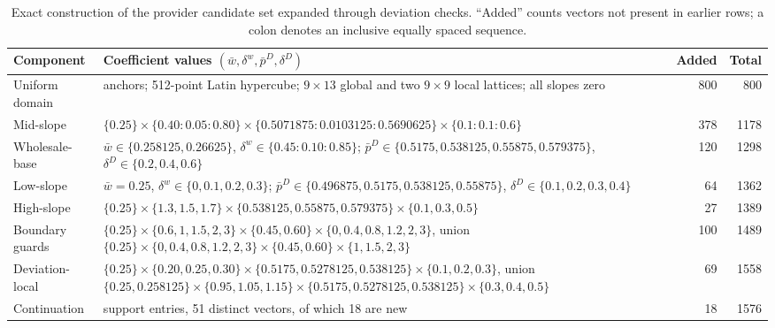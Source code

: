 \documentclass[11pt,a4paper]{article}
\begin{document}
\begin{table}[H]
\centering
\caption{Exact construction of the provider candidate set expanded through deviation checks. ``Added'' counts vectors not present in earlier rows; a colon denotes an inclusive equally spaced sequence.}
\label{tab:candidate_design}
\scriptsize
\begin{tabular}{@{}p{}>{\raggedright\arraybackslash}p{}rr@{}}
\toprule
Component & Coefficient values $(\bar w,\delta^w,\bar p^D,\delta^D)$ & Added & Total \\
\midrule
Uniform domain & 12 anchors; 512-point Latin hypercube; $9\times13$ global and two $9\times9$ local lattices; all slopes zero & 800 & 800 \\
Mid-slope & $\{0.25\}\times\{0.40{:}0.05{:}0.80\}\times\{0.5071875{:}0.0103125{:}0.5690625\}\times\{0.1{:}0.1{:}0.6\}$ & 378 & 1178 \\
Wholesale-base & $\bar w\in\{0.258125,0.26625\}$, $\delta^w\in\{0.45{:}0.10{:}0.85\}$; $\bar p^D\in\{0.5175,0.538125,0.55875,0.579375\}$, $\delta^D\in\{0.2,0.4,0.6\}$ & 120 & 1298 \\
Low-slope & $\bar w=0.25$, $\delta^w\in\{0,0.1,0.2,0.3\}$; $\bar p^D\in\{0.496875,0.5175,0.538125,0.55875\}$, $\delta^D\in\{0.1,0.2,0.3,0.4\}$ & 64 & 1362 \\
High-slope & $\{0.25\}\times\{1.3,1.5,1.7\}\times\{0.538125,0.55875,0.579375\}\times\{0.1,0.3,0.5\}$ & 27 & 1389 \\
Boundary guards & $\{0.25\}\times\{0.6,1,1.5,2,3\}\times\{0.45,0.60\}\times\{0,0.4,0.8,1.2,2,3\}$, union $\{0.25\}\times\{0,0.4,0.8,1.2,2,3\}\times\{0.45,0.60\}\times\{1,1.5,2,3\}$ & 100 & 1489 \\
Deviation-local & $\{0.25\}\times\{0.20,0.25,0.30\}\times\{0.5175,0.5278125,0.538125\}\times\{0.1,0.2,0.3\}$, union $\{0.25,0.258125\}\times\{0.95,1.05,1.15\}\times\{0.5175,0.5278125,0.538125\}\times\{0.3,0.4,0.5\}$ & 69 & 1558 \\
Continuation & 52 support entries, 51 distinct vectors, of which 18 are new & 18 & 1576 \\
\bottomrule
\end{tabular}
\end{table}
\end{document}
